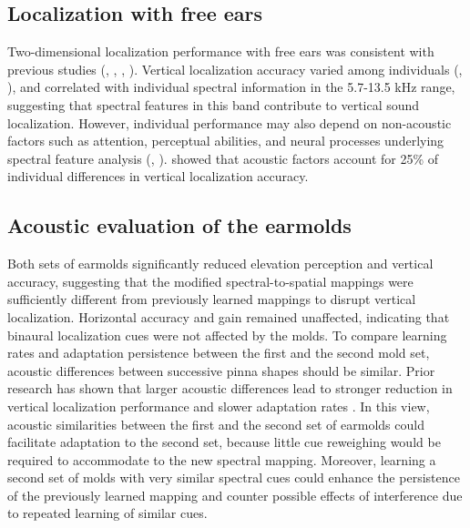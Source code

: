\documentclass[preprint]{JASA}
\begin{document}
\subsection{Localization with free ears} 
Two-dimensional localization performance with free ears was consistent with previous studies (\citet{hofman_relearning_1998}, \citet{makous_two-dimensional_1990}, \citet{oldfield_acuity_1984}, \citet{trapeau_adaptation_2015}). Vertical localization accuracy varied among individuals (\citet{wightman_headphone_1989}, \citet{populin_human_2008}), and correlated with individual spectral information in the 5.7-13.5 kHz range, suggesting that spectral features in this band contribute to vertical sound localization. However, individual performance may also depend on non-acoustic factors such as attention, perceptual abilities, and neural processes underlying spectral feature analysis (\citet{majdak_acoustic_2014}, \citet{andeol_sound_2013}). \citet{trapeau_fast_2016} showed that acoustic factors account for 25\% of individual differences in vertical localization accuracy. 

\subsection{Acoustic evaluation of the earmolds} 
Both sets of earmolds significantly reduced elevation perception and vertical accuracy, suggesting that the modified spectral-to-spatial mappings were sufficiently different from previously learned mappings to disrupt vertical localization. Horizontal accuracy and gain remained unaffected, indicating that binaural localization cues were not affected by the molds. To compare learning rates and adaptation persistence between the first and the second mold set, acoustic differences between successive pinna shapes should be similar. Prior research has shown that larger acoustic differences lead to stronger reduction in vertical localization performance and slower adaptation rates \citep{trapeau_fast_2016}. 
In this view, acoustic similarities between the first and the second set of earmolds could facilitate adaptation to the second set, because little cue reweighing would be required to accommodate to the new spectral mapping. Moreover, learning a second set of molds with very similar spectral cues could enhance the persistence of the previously learned mapping and counter possible effects of interference due to repeated learning of similar cues. 
\end{document}
